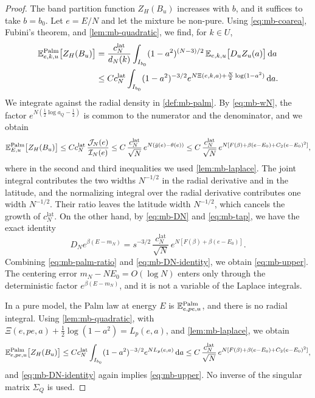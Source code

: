 \begin{proof}
The band partition function $Z_H(B_u)$ increases with $b$, and it suffices to take $b=b_0$. Let $e=E/N$ and let the mixture be non-pure. Using \eqref{eq:mb-coarea}, Fubini's theorem, and \cref{lem:mb-quadratic}, we find, for $k\in U$,
\[
\begin{aligned}
\mathbb E^{\mathrm{Palm}}_{e,k,u}\bigl[Z_H(B_u)\bigr]&=\frac{c_N^{\mathrm{lat}}}{d_N(k)}\int_{I_{b_0}}(1-a^2)^{(N-3)/2}\,\mathbb E_{e,k,u}\bigl[D_uZ_u(a)\bigr]\,\mathrm d a\\
&\le Cc_N^{\mathrm{lat}}\int_{I_{b_0}}(1-a^2)^{-3/2}e^{N\Xi(e,k,a)+\frac N2\log(1-a^2)}\,\mathrm d a .
\end{aligned}
\]
We integrate against the radial density in \cref{def:mb-palm}. By \eqref{eq:mb-wN}, the factor $e^{N(\frac12\log a_Q-\frac12)}$ is common to the numerator and the denominator, and we obtain
\begin{equation}\label{eq:mb-palm-ratio}
\mathbb E^{\mathrm{Palm}}_{E,u}\bigl[Z_H(B_u)\bigr]\le Cc_N^{\mathrm{lat}}\,\frac{\mathcal J_N(e)}{\mathcal I_N(e)}\le C\,\frac{c_N^{\mathrm{lat}}}{\sqrt N}\,e^{N(\bar g(e)-\theta(e))}\le C\,\frac{c_N^{\mathrm{lat}}}{\sqrt N}\,e^{N[F(\beta)+\beta(e-E_0)+C_2(e-E_0)^2]},
\end{equation}
where in the second and third inequalities we used \cref{lem:mb-laplace}. The joint integral contributes the two widths $N^{-1/2}$ in the radial derivative and in the latitude, and the normalizing integral over the radial derivative contributes one width $N^{-1/2}$. Their ratio leaves the latitude width $N^{-1/2}$, which cancels the growth of $c_N^{\mathrm{lat}}$. On the other hand, by \eqref{eq:mb-DN} and \eqref{eq:mb-tap}, we have the exact identity
\begin{equation}\label{eq:mb-DN-identity}
D_Ne^{\beta(E-m_N)}=s^{-3/2}\,\frac{c_N^{\mathrm{lat}}}{\sqrt N}\,e^{N[F(\beta)+\beta(e-E_0)]}.
\end{equation}
Combining \eqref{eq:mb-palm-ratio} and \eqref{eq:mb-DN-identity}, we obtain \eqref{eq:mb-upper}. The centering error $m_N-NE_0=O(\log N)$ enters only through the deterministic factor $e^{\beta(E-m_N)}$, and it is not a variable of the Laplace integrals.

In a pure model, the Palm law at energy $E$ is $\mathbb E^{\mathrm{Palm}}_{e,pe,u}$, and there is no radial integral. Using \cref{lem:mb-quadratic}, with $\Xi(e,pe,a)+\frac12\log(1-a^2)=L_p(e,a)$, and \cref{lem:mb-laplace}, we obtain
\[
\mathbb E^{\mathrm{Palm}}_{e,pe,u}\bigl[Z_H(B_u)\bigr]\le Cc_N^{\mathrm{lat}}\int_{I_{b_0}}(1-a^2)^{-3/2}e^{NL_p(e,a)}\,\mathrm d a\le C\,\frac{c_N^{\mathrm{lat}}}{\sqrt N}\,e^{N[F(\beta)+\beta(e-E_0)+C_2(e-E_0)^2]},
\]
and \eqref{eq:mb-DN-identity} again implies \eqref{eq:mb-upper}. No inverse of the singular matrix $\Sigma_Q$ is used.
\end{proof}

